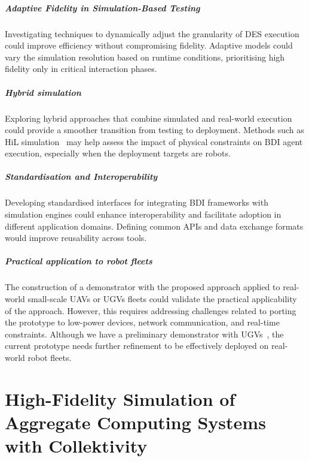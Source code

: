 \paragraph{Adaptive Fidelity in Simulation-Based Testing}

Investigating techniques to dynamically adjust the granularity of \ac{DES} execution
could improve efficiency without compromising fidelity.
%
Adaptive models could vary the simulation resolution based on runtime conditions,
prioritising high fidelity only in critical interaction phases.

\paragraph{Hybrid simulation}

Exploring hybrid approaches that combine simulated and real-world execution
could provide a smoother transition from testing to deployment.
%
Methods such as \ac{HiL} simulation~\cite{DBLP:journals/tec/KoosMD13}
may help assess the impact of physical constraints on \ac{BDI} agent execution,
especially when the deployment targets are robots.

\paragraph{Standardisation and Interoperability}

Developing standardised interfaces for integrating \ac{BDI} frameworks with simulation engines
could enhance interoperability and facilitate adoption in different application domains.
%
Defining common APIs and data exchange formats would improve reusability across tools.


\paragraph{Practical application to robot fleets}
The construction of a demonstrator with the proposed approach
applied to real-world small-scale \acp{UAV} or \acp{UGV} fleets
could validate the practical applicability of the approach.
%
However, this requires addressing challenges related to porting the prototype
to low-power devices, network communication, and real-time constraints.
%
Although we have a preliminary demonstrator with \acp{UGV}~\cite{DBLP:conf/coordination/AguzziBBCCDFPV25},
the current prototype needs further refinement to be effectively deployed on real-world robot fleets.

\chapter{High-Fidelity Simulation of Aggregate Computing Systems with Collektivity}

